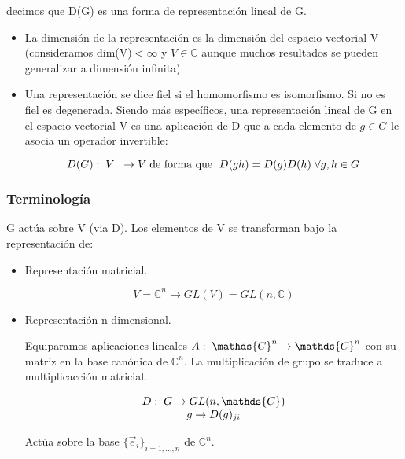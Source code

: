 \documentclass{article}
\begin{document}
decimos que D(G) es una forma de representación lineal de G.

\begin{itemize}
    \item La dimensión de la representación es la dimensión del espacio vectorial V (consideramos dim(V)$<\infty$ y $V\in \mathds{C}$ aunque muchos resultados se pueden generalizar a dimensión infinita).
    \item Una representación se dice fiel si el homomorfismo es isomorfismo. Si no es fiel es degenerada. Siendo más específicos, una representación lineal de G en el espacio vectorial V es una aplicación de D que a cada elemento de $g\in G$ le asocia un operador invertible:

    $$D(G): \hspace{0.1cm} V \hspace{0.2cm} \to V \hspace{0.1cm}\text{de forma que } \hspace{0.1cm} D(gh)=D(g)D(h)\hspace{0.1cm} \forall g,h \in G$$
\end{itemize}

\subsubsection{Terminología}
G actúa sobre V (via D). Los elementos de V se transforman bajo la representación de:

\begin{itemize}
    \item Representación matricial.

    $$V=\mathds{C}^n\to GL(V)=GL(n, \mathds{C})$$
     \item Representación n-dimensional.

     Equiparamos aplicaciones lineales $A: \hspace{0.1cm} \mathds{C}^n \to  \mathds{C}^n$ con su matriz en la base canónica de $\mathds{C}^n$. La multiplicación de grupo se traduce a multiplicacción matricial.

     $$\begin{array}{cc}
          D: \hspace{0.1cm}G \to GL(n, \mathds{C}) \\
          g\to D(g)_{ji}
     \end{array}$$

    Actúa sobre la base $\lbrace \Vec{e}_i\rbrace_{i=1,...,n}$ de $\mathds{C}^n$.
\end{itemize}
\end{document}
